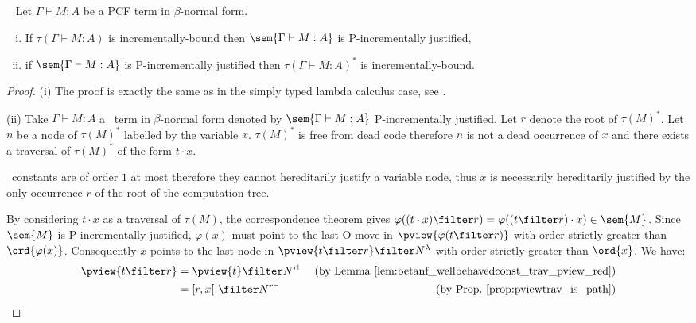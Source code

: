 \begin{proposition} \
\label{prop:Nher_incrbound_and_incrjustified_pcf} Let $\Gamma \vdash
M : A$ be a PCF term in $\beta$-normal form.
\begin{enumerate}[(i)]
\item  If $\tau(\Gamma \vdash M : A)$ is incrementally-bound then $\sem{\Gamma \vdash M : A}$ is P-incrementally justified,
\item  if $\sem{\Gamma \vdash M : A}$ is P-incrementally justified
then $\tau(\Gamma \vdash M : A)^*$ is incrementally-bound.
\end{enumerate}
\end{proposition}
\begin{proof}
(i) The proof is exactly the same as in the simply typed lambda calculus case,
see \cite[Proposition 4.1.5(i)]{blumtransfer}.

\noindent (ii)
Take $\Gamma \vdash M : A$ a \pcf\ term in $\beta$-normal form denoted by $\sem{\Gamma \vdash M : A}$ P-incrementally justified. Let $r$ denote the root of $\tau(M)^*$.
Let $n$ be a node of $\tau(M)^*$ labelled by the variable $x$.
$\tau(M)^*$ is free from dead code therefore $n$ is not a dead occurrence of $x$ and there exists a traversal of $\tau(M)^*$ of the form $t \cdot x$.

\pcf\ constants are of order $1$ at most therefore they cannot
hereditarily justify a variable node, thus $x$ is necessarily
hereditarily justified by the only occurrence $r$ of the root of the
computation tree.

By considering $t\cdot x$ as a traversal of $\tau(M)$,  the
correspondence theorem gives $\varphi((t \cdot x) \filter r) =
\varphi((t \filter r) \cdot x) \in \sem{M}$. Since $\sem{M}$ is
P-incrementally justified, $\varphi(x)$ must point to the last
O-move in $\pview{\varphi(t \filter r)}$ with order strictly greater
than $\ord{\varphi(x)}$. Consequently $x$ points to the last node in
$\pview{t \filter r} \filter N^{\lambda}$ with order strictly
greater than $\ord{x}$. We have:
\begin{align*}
\pview{t \filter r} &= \pview{t} \filter N^{r \vdash} & (\mbox{by Lemma \ref{lem:betanf_wellbehavedconst_trav_pview_red}}) \\
& = [r,x[ \ \filter N^{r \vdash} & (\mbox{by Prop.\ \ref{prop:pviewtrav_is_path}})
\end{align*}


\end{proof}
